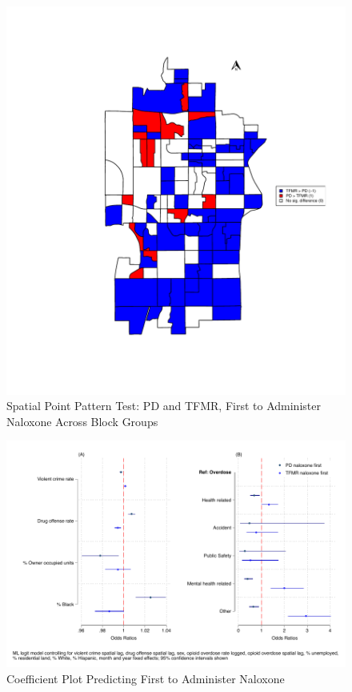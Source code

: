 \begin{figure}
    \caption{Spatial Point Pattern Test: PD and TFMR, First to Administer Naloxone Across Block Groups}
    \centering
    \includegraphics{figures/sppt-naloxone.pdf}
\end{figure}

\newpage



\newpage

\begin{figure}
    \caption{Coefficient Plot Predicting First to Administer Naloxone}
    \centering
    \includegraphics{figures/me-logit-coef-comb.pdf}
\end{figure}


